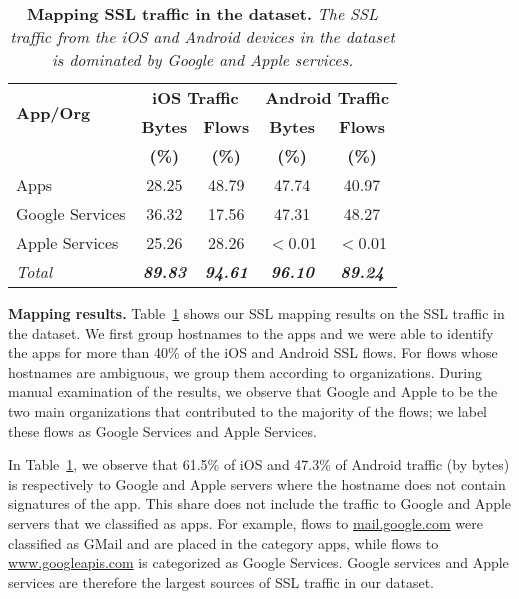 \begin{table}
\centering
\begin{small}
\begin{tabular}{|p{}|c|c|c|c|}
\hline
\multirow{2}{*}{\bf App/Org} & \multicolumn{2}{c|}{\bf iOS Traffic} &  \multicolumn{2}{c|}{\bf Android Traffic} \tabularnewline
\cline{2-5}
                              & {\bf Bytes}  & {\bf Flows} & {\bf Bytes} & {\bf Flows}   \tabularnewline
                              & {\bf (\%)}  & {\bf (\%)} & {\bf (\%)} & {\bf (\%)}   \tabularnewline
\hline

Apps            & 28.25 & 48.79 & 47.74 & 40.97 \tabularnewline
\hline
Google Services & 36.32 & 17.56 & 47.31 & 48.27 \tabularnewline
\hline
Apple Services  & 25.26 & 28.26 & $<$0.01 & $<$0.01 \tabularnewline
\hline
{\emph{Total}}  & {\em \bf 89.83} & {\em\bf 94.61} & {\em\bf  96.10}  &  {\em\bf  89.24} \tabularnewline
\hline
\end{tabular}
\end{small}
\caption{\textbf{Mapping SSL traffic in the \mobWild dataset.} \emph{The SSL traffic from the iOS and Android devices in the \mobWild dataset is dominated by Google and Apple services.}}
\label{tab:classify-ssl-traffic}
\vspace{\postfigspace}
\end{table}

\noindent\textbf{Mapping results.} 
Table~\ref{tab:classify-ssl-traffic} shows our SSL mapping results on the SSL traffic in the \mobWild dataset. 
We first group hostnames to the apps and we were able to identify the apps for more than 40\% of the iOS and Android SSL flows.
For flows whose hostnames are ambiguous, we group them according to organizations.
During manual examination of the results, we observe that Google and Apple to be the two main organizations that contributed to the majority of the flows; we label these flows as Google Services and Apple Services. 

In Table~\ref{tab:classify-ssl-traffic}, we observe that 61.5\% of iOS and 47.3\% of Android traffic (by bytes) is respectively 
to Google and Apple servers where the hostname does not contain signatures of the app.
This share does not include the traffic to Google and Apple servers that we classified as apps.
For example, flows to \url{mail.google.com} were classified as GMail and are placed in the category apps, while flows to \url{www.googleapis.com} is categorized as Google Services. 
Google services and Apple services are therefore the largest sources of SSL traffic in our \mobWild dataset.

